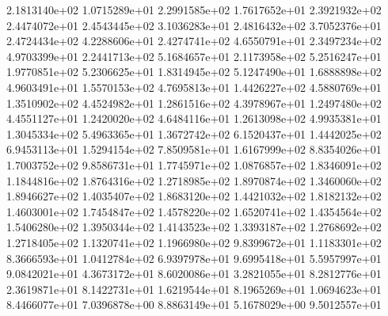 2.1813140e+02   1.0715289e+01   
2.2991585e+02   1.7617652e+01   
2.3921932e+02   2.4474072e+01   
2.4543445e+02   3.1036283e+01   
2.4816432e+02   3.7052376e+01   
2.4724434e+02   4.2288606e+01   
2.4274741e+02   4.6550791e+01   
2.3497234e+02   4.9703399e+01   
2.2441713e+02   5.1684657e+01   
2.1173958e+02   5.2516247e+01   
1.9770851e+02   5.2306625e+01   
1.8314945e+02   5.1247490e+01   
1.6888898e+02   4.9603491e+01   
1.5570153e+02   4.7695813e+01   
1.4426227e+02   4.5880769e+01   
1.3510902e+02   4.4524982e+01   
1.2861516e+02   4.3978967e+01   
1.2497480e+02   4.4551127e+01   
1.2420020e+02   4.6484116e+01   
1.2613098e+02   4.9935381e+01   
1.3045334e+02   5.4963365e+01   
1.3672742e+02   6.1520437e+01   
1.4442025e+02   6.9453113e+01   
1.5294154e+02   7.8509581e+01   
1.6167999e+02   8.8354026e+01   
1.7003752e+02   9.8586731e+01   
1.7745971e+02   1.0876857e+02   
1.8346091e+02   1.1844816e+02   
1.8764316e+02   1.2718985e+02   
1.8970874e+02   1.3460060e+02   
1.8946627e+02   1.4035407e+02   
1.8683120e+02   1.4421032e+02   
1.8182132e+02   1.4603001e+02   
1.7454847e+02   1.4578220e+02   
1.6520741e+02   1.4354564e+02   
1.5406280e+02   1.3950344e+02   
1.4143523e+02   1.3393187e+02   
1.2768692e+02   1.2718405e+02   
1.1320741e+02   1.1966980e+02   
9.8399672e+01   1.1183301e+02   
8.3666593e+01   1.0412784e+02   
6.9397978e+01   9.6995418e+01   
5.5957997e+01   9.0842021e+01   
4.3673172e+01   8.6020086e+01   
3.2821055e+01   8.2812776e+01   
2.3619871e+01   8.1422731e+01   
1.6219544e+01   8.1965269e+01   
1.0694623e+01   8.4466077e+01   
7.0396878e+00   8.8863149e+01   
5.1678029e+00   9.5012557e+01   
